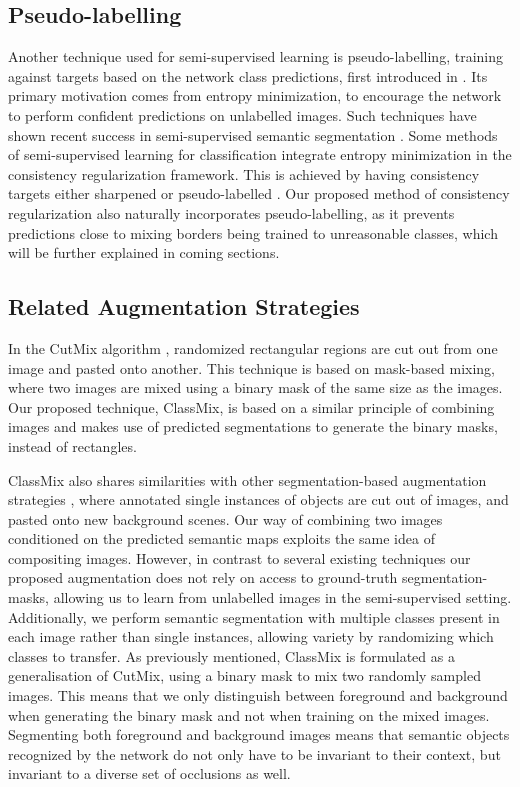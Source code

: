 \documentclass[10pt,twocolumn,letterpaper]{article}
\begin{document}
\subsection{Pseudo-labelling}
Another technique used for semi-supervised learning is pseudo-labelling, training against targets based on the network class predictions, first introduced in \cite{pseudo-label}. Its primary motivation comes from entropy minimization, to encourage the network to perform confident predictions on unlabelled images. Such techniques have shown recent success in semi-supervised semantic segmentation \cite{Feng,chen2020leveraging,kalluri2019universal}. Some methods of semi-supervised learning for classification \cite{xie2019unsupervised,FixMatch,berthelot2019mixmatch,ReMixMatch} integrate entropy minimization in the consistency regularization framework. This is achieved by having consistency targets either sharpened \cite{xie2019unsupervised,berthelot2019mixmatch,ReMixMatch} or pseudo-labelled \cite{FixMatch}. Our proposed method of consistency regularization also naturally incorporates pseudo-labelling, as it prevents predictions close to mixing borders being trained to unreasonable classes, which will be further explained in coming sections.

\subsection{Related Augmentation Strategies}
In the CutMix algorithm \cite{CutMix}, randomized rectangular regions are cut out from one image and pasted onto another. This technique is based on mask-based mixing, where two images are mixed using a binary mask of the same size as the images. Our proposed technique, ClassMix, is based on a similar principle of combining images and makes use of predicted segmentations to generate the binary masks, instead of rectangles.

ClassMix also shares similarities with other segmentation-based augmentation strategies \cite{dwibedi2017cut,remez2018learning,Dvornik2018,Tripathi_2019_CVPR,Fang_2019_ICCV}, where annotated single instances of objects are cut out of images, and pasted onto new background scenes. Our way of combining two images conditioned on the predicted semantic maps exploits the same idea of compositing images. However, in contrast to several existing techniques our proposed augmentation does not rely on access to ground-truth segmentation-masks, allowing us to learn from unlabelled images in the semi-supervised setting. Additionally, we perform semantic segmentation with multiple classes present in each image rather than single instances, allowing variety by randomizing which classes to transfer. As previously mentioned, ClassMix is formulated as a generalisation of CutMix, using a binary mask to mix two randomly sampled images. This means that we only distinguish between foreground and background when generating the binary mask and not when training on the mixed images. Segmenting both foreground and background images means that semantic objects recognized by the network do not only have to be invariant to their context, but invariant to a diverse set of occlusions as well. 
\end{document}
